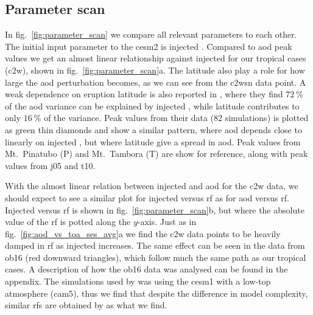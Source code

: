 \documentclass{ametsocV6.1}
\newcommand{\iso}[1][i]{{#1}njected \ce{SO2}}
\begin{document}
\subsection{Parameter scan}

In fig.~\ref{fig:parameter_scan} we compare all relevant parameters to each other. The
initial input parameter to the \gls{cesm2} is injected . Compared to \gls{aod}
peak values we get an almost linear relationship against \iso{} for our tropical cases
(\gls{c2w}), shown in fig.~\ref{fig:parameter_scan}a. The latitude also play a role for
how large the \gls{aod} perturbation becomes, as we can see from the \gls{c2wsn} data
point. A weak dependence on eruption latitude is also reported in \citet{marshall2019},
where they find \(\SI{72}{\percent}\) of the \gls{aod} variance can be explained by
\iso{}, while latitude contributes to only \(\SI{16}{\percent}\) of the variance. Peak
values from their data (82 simulations) is plotted as green thin diamonds and show a
similar pattern, where \gls{aod} depends close to linearly on \iso{}, but where latitude
give a spread in \gls{aod}. Peak values from Mt.\ Pinatubo (P) and Mt.\ Tambora (T) are
show for reference, along with peak values from \gls{j05} and \gls{t10}.

With the almost linear relation between \iso{} and \gls{aod} for the \gls{c2w} data, we
should expect to see a similar plot for \iso{} versus \gls{rf} as for \gls{aod} versus
\gls{rf}. \iso[I] versus \gls{rf} is shown in fig.~\ref{fig:parameter_scan}b, but where
the absolute value of the \gls{rf} is potted along the \(y\)-axis. Just as in
fig.~\ref{fig:aod_vs_toa_ses_avg}a we find the \gls{c2w} data points to be heavily
damped in \gls{rf} as \iso{} increases. The same effect can be seen in the data from
\gls{ob16} (red downward triangles), which follow much the same path as our tropical
cases. A description of how the \gls{ob16} data was analysed can be found in the
appendix. The simulations used by \citet{ottobliesner2016} was using the \gls{cesm1}
with a low-top atmosphere (\gls{cam5}), thus we find that despite the difference in
model complexity, similar \glspl{rf} are obtained by \citet{ottobliesner2016} as what we
find.
\end{document}
